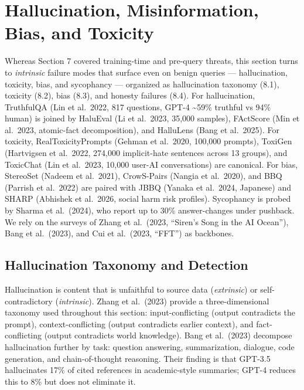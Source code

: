 \documentclass{article}
\begin{document}
\section{Hallucination, Misinformation, Bias, and Toxicity}\label{hallucination-misinformation-bias-and-toxicity}

Whereas Section 7 covered training-time and pre-query threats, this section turns to \emph{intrinsic} failure modes that surface even on benign queries --- hallucination, toxicity, bias, and sycophancy --- organized as hallucination taxonomy (8.1), toxicity (8.2), bias (8.3), and honesty failures (8.4). For hallucination, TruthfulQA (Lin et al.~2022, 817 questions, GPT-4 \textasciitilde59\% truthful vs 94\% human) is joined by HaluEval (Li et al.~2023, 35,000 samples), FActScore (Min et al.~2023, atomic-fact decomposition), and HalluLens (Bang et al.~2025). For toxicity, RealToxicityPrompts (Gehman et al.~2020, 100,000 prompts), ToxiGen (Hartvigsen et al.~2022, 274,000 implicit-hate sentences across 13 groups), and ToxicChat (Lin et al.~2023, 10,000 user-AI conversations) are canonical. For bias, StereoSet (Nadeem et al.~2021), CrowS-Pairs (Nangia et al.~2020), and BBQ (Parrish et al.~2022) are paired with JBBQ (Yanaka et al.~2024, Japanese) and SHARP (Abhishek et al.~2026, social harm risk profiles). Sycophancy is probed by Sharma et al.~(2024), who report up to 30\% answer-changes under pushback. We rely on the surveys of Zhang et al.~(2023, ``Siren's Song in the AI Ocean''), Bang et al.~(2023), and Cui et al.~(2023, ``FFT'') as backbones.

\subsection{Hallucination Taxonomy and Detection}\label{hallucination-taxonomy-and-detection}

Hallucination is content that is unfaithful to source data (\emph{extrinsic}) or self-contradictory (\emph{intrinsic}). Zhang et al.~(2023) provide a three-dimensional taxonomy used throughout this section: input-conflicting (output contradicts the prompt), context-conflicting (output contradicts earlier context), and fact-conflicting (output contradicts world knowledge). Bang et al.~(2023) decompose hallucination further by task: question answering, summarization, dialogue, code generation, and chain-of-thought reasoning. Their finding is that GPT-3.5 hallucinates 17\% of cited references in academic-style summaries; GPT-4 reduces this to 8\% but does not eliminate it.
\end{document}
